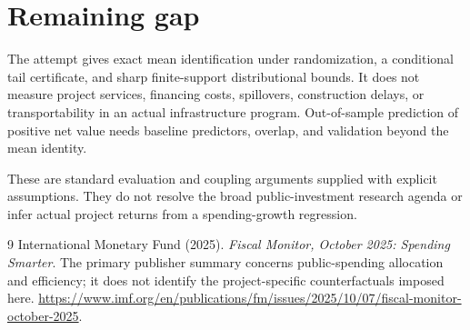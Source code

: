 \documentclass[11pt,a4paper]{article}
\begin{document}
\section{Remaining gap}
The attempt gives exact mean identification under randomization, a conditional tail certificate, and sharp finite-support distributional bounds. It does not measure project services, financing costs, spillovers, construction delays, or transportability in an actual infrastructure program. Out-of-sample prediction of positive net value needs baseline predictors, overlap, and validation beyond the mean identity.

These are standard evaluation and coupling arguments supplied with explicit assumptions. They do not resolve the broad public-investment research agenda or infer actual project returns from a spending-growth regression.
\begin{thebibliography}{9}
 International Monetary Fund (2025).
\emph{Fiscal Monitor, October 2025: Spending Smarter}.
The primary publisher summary concerns public-spending allocation and efficiency; it does not identify the project-specific counterfactuals imposed here.
\url{https://www.imf.org/en/publications/fm/issues/2025/10/07/fiscal-monitor-october-2025}.
\end{thebibliography}
\end{document}
